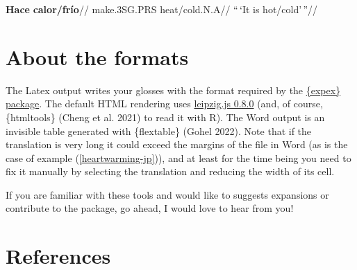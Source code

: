\documentclass[
]{article}
\begin{document}
\ex\label{formatted} \begingl \gla \textbf{Hace} \textbf{calor/frío}// \glb make.3SG.PRS heat/cold.N.A// \glft ``\,`It is hot/cold'\,''//
\endgl \xe 

\hypertarget{about-the-formats}{%
\section{About the formats}\label{about-the-formats}}

The Latex output writes your glosses with the format required by the \href{https://ctan.org/pkg/expex?lang=en}{\{expex\} package}. The default HTML rendering uses \href{https://github.com/bdchauvette/leipzig.js/}{leipzig.js 0.8.0} (and, of course, \{htmltools\} (Cheng et al. 2021) to read it with R). The Word output is an invisible table generated with \{flextable\} (Gohel 2022). Note that if the translation is very long it could exceed the margins of the file in Word (as is the case of example (\ref{heartwarming-jp})), and at least for the time being you need to fix it manually by selecting the translation and reducing the width of its cell.

If you are familiar with these tools and would like to suggests expansions or contribute to the package, go ahead, I would love to hear from you!

\hypertarget{references}{%
\section*{References}\label{references}}
\end{document}
